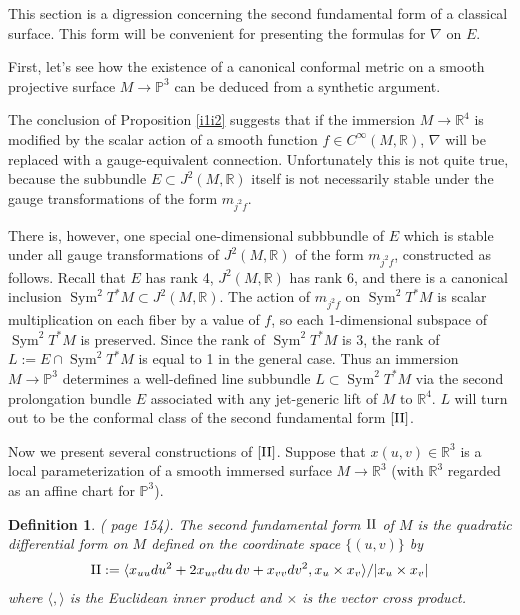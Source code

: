 \documentclass[12pt]{article}
\numberwithin{equation}{section}
\theoremstyle{plain}
\newtheorem{definition}{Definition}[section]
\theoremstyle{definition}
\renewcommand{\P}{\mathbb{P}}
\newcommand{\R}{\mathbb{R}}
\newcommand{\II}{\textnormal{II}}
\newcommand{\ra}{\rightarrow}
\begin{document}
This section is a digression concerning the second fundamental form of a classical surface. This form will be convenient for presenting the formulas for $\nabla$ on $E$.

First, let's see how the existence of a canonical conformal metric on a smooth projective surface $M\ra \P^{3}$ can be deduced from a synthetic argument.

The conclusion of Proposition \ref{i1i2} suggests that if the immersion $M\ra \R^{4}$ is modified by the scalar action of a smooth function $f\in C^{\infty}(M,\R)$, $\nabla$ will be replaced with a gauge-equivalent connection. Unfortunately this is not quite true, because the subbundle $E\subset J^{2}(M,\R)$ itself is not necessarily stable under the gauge transformations of the form $m_{j^{2}f}$.

There is, however, one special one-dimensional subbbundle of $E$ which is stable under all gauge transformations of $J^{2}(M,\R)$ of the form $m_{j^{2}f}$, constructed as follows. Recall that $E$ has rank 4, $J^{2}(M,\R)$ has rank 6, and there is a canonical inclusion $\operatorname{Sym}^{2}T^{*}M\subset J^{2}(M,\R)$. The action of $m_{j^{2}f}$ on $\operatorname{Sym}^{2}T^{*}M$ is scalar multiplication on each fiber by a value of $f$, so each 1-dimensional subspace of $\operatorname{Sym}^{2}T^{*}M$ is preserved. Since the rank of $\operatorname{Sym}^{2}T^{*}M$ is 3, the rank of $L:=E\cap \operatorname{Sym}^{2}T^{*}M$ is equal to 1 in the general case. Thus an immersion $M\ra \P^{3}$ determines a well-defined line subbundle $L\subset \operatorname{Sym}^{2}T^{*}M$ via the second prolongation bundle $E$ associated with any jet-generic lift of $M$ to $\R^{4}$. $L$ will turn out to be the conformal class of the second fundamental form $[\II]$.

Now we present several constructions of $[\II]$. Suppose that $x(u,v)\in \R^{3}$ is a local parameterization of a smooth immersed surface $M\ra \R^{3}$ (with $\R^{3}$ regarded as an affine chart for $\P^{3}$).

\begin{definition}\label{dcII} \emph{(\cite{bdocarmo} page 154).} The \emph{second fundamental form} $\II$ of $M$ is the quadratic differential form on $M$ defined on the coordinate space $\{(u,v)\}$ by
\begin{align*}
\II:=\langle x_{uu} du^{2} + 2 x_{uv} du\thinspace dv + x_{vv} dv^{2}, x_{u} \times x_{v}\rangle / |x_{u}\times x_{v}|
\end{align*}
where $\langle,\rangle$ is the Euclidean inner product and $\times$ is the vector cross product.
\end{definition}
\end{document}
